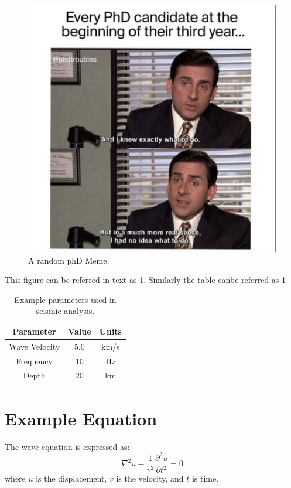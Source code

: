 \begin{figure}
    \centering
    \includegraphics[width=1\linewidth]{Figures//C1/f_1_1.png}
    \caption{A random phD Meme.}
    \label{fig: 1.1}
\end{figure}

This figure can be referred in text as \ref{fig: 1.1}. Similarly the table canbe referred as \ref{tab: 1.1}

\begin{table}[h!]
    \centering
    \begin{tabular}{|c|c|c|}
        \hline
        \textbf{Parameter} & \textbf{Value} & \textbf{Units} \\
        \hline
        Wave Velocity & 5.0 & km/s \\
        Frequency & 10 & Hz \\
        Depth & 20 & km \\
        \hline
    \end{tabular}
    \caption{Example parameters used in seismic analysis.}
    \label{tab: 1.1}
\end{table}

\section*{Example Equation}
The wave equation is expressed as:
\begin{equation}
    \nabla^2 u - \frac{1}{v^2} \frac{\partial^2 u}{\partial t^2} = 0
\end{equation}
where \( u \) is the displacement, \( v \) is the velocity, and \( t \) is time.


